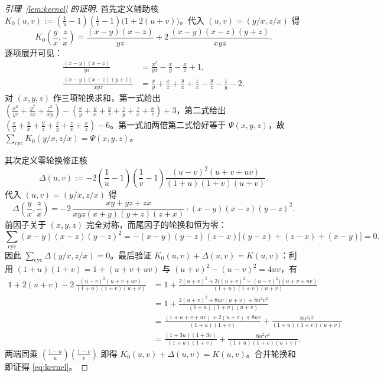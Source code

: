 \documentclass[11pt,a4paper]{article}
\theoremstyle{remark}
\begin{document}
\begin{proof}[引理~\ref{lem:kernel} 的证明]
首先定义辅助核 $K_0(u,v) := (\tfrac{1}{u}-1)(\tfrac{1}{v}-1)\big(1 + 2(u+v)\big)$。代入 $(u,v)=(y/x,z/x)$ 得
\[
K_0\!\left(\frac{y}{x},\frac{z}{x}\right)
= \frac{(x-y)(x-z)}{yz} + 2\,\frac{(x-y)(x-z)(y+z)}{xyz}.
\]
逐项展开可见：
\begin{align*}
  \frac{(x-y)(x-z)}{yz} &= \frac{x^2}{yz} - \frac{x}{y} - \frac{x}{z} + 1, \\
  \frac{(x-y)(x-z)(y+z)}{xyz} &= \frac{x}{y} + \frac{x}{z} + \frac{y}{x} + \frac{z}{x} - \frac{y}{z} - \frac{z}{y} - 2.
\end{align*}
对 $(x,y,z)$ 作三项轮换求和，第一式给出 $(\tfrac{x^2}{yz}+\tfrac{y^2}{zx}+\tfrac{z^2}{xy}) - (\tfrac{x}{y}+\tfrac{y}{x}+\tfrac{y}{z}+\tfrac{z}{y}+\tfrac{z}{x}+\tfrac{x}{z}) + 3$，第二式给出 $(\tfrac{x}{y}+\tfrac{y}{x}+\tfrac{y}{z}+\tfrac{z}{y}+\tfrac{z}{x}+\tfrac{x}{z}) - 6$。第一式加两倍第二式恰好等于 $\Psi(x,y,z)$，故 $\sum_{\mathrm{cyc}} K_0(y/x, z/x) = \Psi(x,y,z)$。

其次定义零轮换修正核
\[
\Delta(u,v) := -2\left(\frac{1}{u}-1\right)\left(\frac{1}{v}-1\right)\frac{(u-v)^2(u+v+uv)}{(1+u)(1+v)(u+v)}.
\]
代入 $(u,v)=(y/x,z/x)$ 得
\[
\Delta\!\left(\frac{y}{x},\frac{z}{x}\right) = -2\,\frac{xy+yz+zx}{xyz(x+y)(y+z)(z+x)} \cdot (x-y)(x-z)(y-z)^2.
\]
前因子关于 $(x,y,z)$ 完全对称，而尾因子的轮换和恒为零：
\[
\sum_{\mathrm{cyc}}(x-y)(x-z)(y-z)^2 = -(x-y)(y-z)(z-x)\big[(y-z)+(z-x)+(x-y)\big] = 0.
\]
因此 $\sum_{\mathrm{cyc}} \Delta(y/x, z/x) = 0$。最后验证 $K_0(u,v) + \Delta(u,v) = K(u,v)$：利用 $(1+u)(1+v)=1+(u+v+uv)$ 与 $(u+v)^2-(u-v)^2 = 4uv$，有
\begin{align*}
  1 + 2(u+v) - 2\,\frac{(u-v)^2(u+v+uv)}{(1+u)(1+v)(u+v)}
  &= 1 + \frac{2(u+v)^2 + 2\big((u+v)^2-(u-v)^2\big)(u+v+uv)}{(1+u)(1+v)(u+v)} \\
  &= 1 + \frac{2(u+v)^2 + 8uv(u+v) + 8u^2v^2}{(1+u)(1+v)(u+v)} \\
  &= \frac{(1+u+v+uv) + 2(u+v) + 8uv}{(1+u)(1+v)} + \frac{8u^2v^2}{(1+u)(1+v)(u+v)} \\
  &= \frac{(1+3u)(1+3v)}{(1+u)(1+v)} + \frac{8u^2v^2}{(1+u)(1+v)(u+v)}.
\end{align*}
两端同乘 $(\tfrac{1-u}{u})(\tfrac{1-v}{v})$ 即得 $K_0(u,v) + \Delta(u,v) = K(u,v)$。合并轮换和即证得 \eqref{eq:kernel}。
\end{proof}
\end{document}

